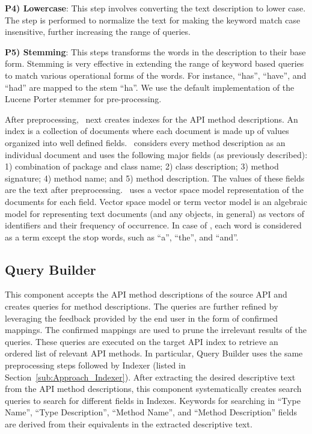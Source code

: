 \textbf{P4) Lowercase}: This step involves converting the text description to lower case. The step is performed to normalize the text for making the keyword match case insensitive, further increasing the range of queries.
	
\textbf{P5) Stemming}: This steps transforms the words in the description to their base form. Stemming is very effective in extending the range of keyword based queries to match various operational forms of the words. For instance, ``has'', ``have'', and ``had'' are mapped to the stem ``ha''. We use the default implementation of the Lucene Porter stemmer for pre-processing. 
	


After preprocessing, \tool\ next creates indexes for the API method descriptions.
An index is a collection of documents where each document is made up of 
values organized into well defined fields.
\tool\ considers every method description as an individual document and 
uses the following major fields (as previously described):
1) combination of package and class name;
2) class description;
3) method signature;
4) method name; and
5) method description.
The values of these fields are the text after preprocessing.
\tool\ uses a vector space model representation of the documents for each field. 
Vector space model or term vector model is an algebraic model for representing text documents (and any objects, in general) as vectors of identifiers and their frequency of occurrence. 
In case of \tool, each word is considered as a term except the stop words, such as ``a'', ``the'', and ``and''.


  

\subsection{Query Builder}
\label{sub:Approach_Searcher}

This component accepts the API method descriptions of the source API
and creates queries for method descriptions.
The queries are further refined by leveraging the feedback provided by the end user in the form of confirmed mappings.
The confirmed mappings are used to prune the irrelevant results of the queries.
These queries are executed on the target API index to retrieve 
an ordered list of relevant API methods.
In particular, Query Builder uses the same preprocessing steps followed by Indexer
(listed in Section~\ref{sub:Approach_Indexer}).
After extracting the desired descriptive text from the API method descriptions,
this component systematically creates search queries to search for different fields in Indexes.
Keywords for searching in ``Type Name'', ``Type Description'', ``Method Name'', and ``Method Description'' fields are derived from their equivalents in the extracted descriptive text.




